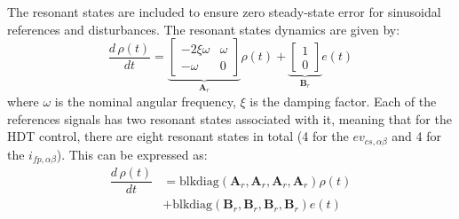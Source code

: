 The resonant states are included to ensure zero steady-state error for sinusoidal references and disturbances. The resonant states dynamics are given by:
\begin{equation}
    \dfrac{d\,\rho(t)}{dt} = 
    \underbrace{
    \begin{bmatrix}
        -2\xi\omega & \omega \\
        -\omega & 0
    \end{bmatrix}
    }_{\mathbf{A}_r}
    \rho(t) + 
    \underbrace{
    \begin{bmatrix}
        1\\
        0
    \end{bmatrix}
    }_{\mathbf{B}_r}
    e(t)
\end{equation}
where $\omega$ is the nominal angular frequency, $\xi$ is the damping factor. Each of the references signals has two resonant states associated with it, meaning that for the HDT control, there are eight resonant states in total (4 for the $ev_{cs,\alpha\beta}$ and 4 for the $i_{fp,\alpha\beta}$). This can be expressed as:
\begin{align}
    \dfrac{d\,\rho(t)}{dt} &= \text{blkdiag}(\mathbf{A}_r, \mathbf{A}_r, \mathbf{A}_r, \mathbf{A}_r)\rho(t)\\
    &+ \text{blkdiag}(\mathbf{B}_r, \mathbf{B}_r, \mathbf{B}_r, \mathbf{B}_r)e(t)
\end{align}

